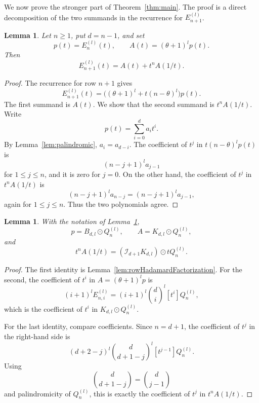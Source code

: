 \documentclass[reqno]{amsart}
\numberwithin{equation}{section}
\newtheorem{lemma}[theorem]{Lemma}
\theoremstyle{definition}
\newcommand{\coeff}[2]{[#1]#2}
\newcommand{\had}{\odot}
\newcommand{\opI}{\mathcal{I}}
\begin{document}
We now prove the stronger part of Theorem~\ref{thm:main}.  The proof is a
direct decomposition of the two summands in the recurrence for
$E_{n+1}^{(l)}$.

\begin{lemma}
\label{lem:boundaryDecomposition}
Let $n\geq 1$, put $d=n-1$, and set
\[
  p(t)=E_n^{(l)}(t),
  \qquad
  A(t)=(\theta+1)^lp(t).
\]
Then
\[
  E_{n+1}^{(l)}(t)=A(t)+t^nA(1/t).
\]
\end{lemma}

\begin{proof}
The recurrence for row $n+1$ gives
\[
  E_{n+1}^{(l)}(t)
  =
  \bigl((\theta+1)^l+t(n-\theta)^l\bigr)p(t).
\]
The first summand is $A(t)$.  We show that the second summand is
$t^nA(1/t)$.  Write
\[
  p(t)=\sum_{i=0}^{d}a_i t^i .
\]
By Lemma~\ref{lem:palindromic}, $a_i=a_{d-i}$.  The coefficient of $t^j$ in
$t(n-\theta)^lp(t)$ is
\[
  (n-j+1)^l a_{j-1}
\]
for $1\leq j\leq n$, and it is zero for $j=0$.  On the other hand,
the coefficient of $t^j$ in $t^nA(1/t)$ is
\[
  (n-j+1)^l a_{n-j}
  =
  (n-j+1)^l a_{j-1},
\]
again for $1\leq j\leq n$.  Thus the two polynomials agree.
\end{proof}

\begin{lemma}
\label{lem:summandDecompositions}
With the notation of Lemma~\ref{lem:boundaryDecomposition},
\[
  p=B_{d,l}\had Q_n^{(l)},
  \qquad
  A=K_{d,l}\had Q_n^{(l)},
\]
and
\[
  t^nA(1/t)
  =
  (\opI_{d+1}K_{d,l})\had tQ_n^{(l)}.
\]
\end{lemma}

\begin{proof}
The first identity is Lemma~\ref{lem:rowHadamardFactorization}.  For the
second, the coefficient of $t^i$ in $A=(\theta+1)^lp$ is
\[
  (i+1)^l E_{n,i}^{(l)}
  =
  (i+1)^l\binom di^l \coeff{t^i}{Q_n^{(l)}},
\]
which is the coefficient of $t^i$ in $K_{d,l}\had Q_n^{(l)}$.

For the last identity, compare coefficients.  Since $n=d+1$, the coefficient
of $t^j$ in the right-hand side is
\[
  (d+2-j)^l\binom d{d+1-j}^l\coeff{t^{j-1}}{Q_n^{(l)}}.
\]
Using
\[
  \binom d{d+1-j}=\binom d{j-1}
\]
and palindromicity of $Q_n^{(l)}$, this is exactly the coefficient of
$t^j$ in $t^nA(1/t)$.
\end{proof}
\end{document}

